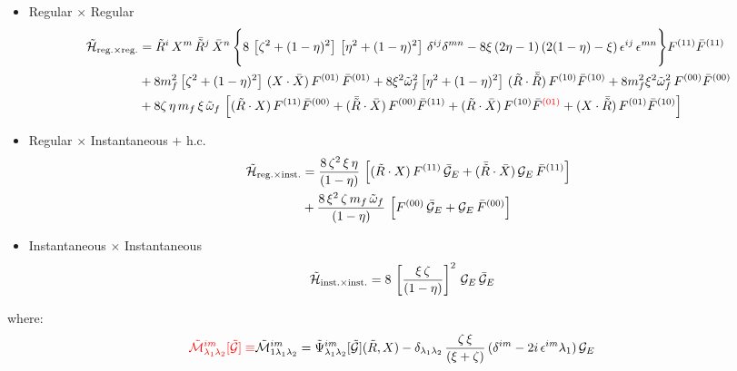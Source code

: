 \documentclass[9pt]{article}
\newcommand{\chg}[1]{{\color{red}#1}}
\numberwithin{equation}{section}
\begin{document}
\begin{itemize}
    \item Regular $\times$ Regular
    \begin{align}
        \mathcal{\Tilde{H}}_{\mathrm{reg.}\times \mathrm{reg.}} & = \Tilde{R}^{i}\, X^{m}\, \Bar{\Tilde{R}}^{j}\,\Bar{X}^{n}\,\Bigg\{8\,\left[\zeta^{2} + (1-\eta)^{2}\right]\,\left[\eta^{2} + (1-\eta)^{2}\right]\,\delta^{ij}\delta^{mn}- 8\xi\, (2\eta -1)\,(2(1-\eta)-\xi)\,\epsilon^{ij}\,\epsilon^{mn}\Bigg\}F^{(11)}\Bar{F}^{(11)}\notag \\ & +8m^{2}_{f}\left[\zeta^{2} + (1-\eta)^{2}\right]\, (X\cdot \Bar{X})\,F^{(01)}\,\Bar{F}^{(01)} + 8\xi^{2}\Tilde{\omega}^{2}_{f}\left[\eta^{2}+(1-\eta)^{2}\right]\,(\Tilde{R}\cdot \Bar{\Tilde{R}})\,F^{(10)}\Bar{F}^{(10)} +8m^{2}_{f}\xi^{2}\Tilde{\omega}^{2}_{f}\,F^{(00)}\Bar{F}^{(00)}\notag \\ & +8\zeta\,\eta\, m_{f}\, \xi\, \Tilde{\omega}_{f}\, \left[(\Tilde{R}\cdot X)\, F^{(11)}\Bar{F}^{(00)} + (\Bar{\Tilde{R}}\cdot \Bar{X})\,F^{(00)}\Bar{F}^{(11)} + (\Tilde{R}\cdot \Bar{X})\,F^{(10)}\Bar{F}^{\chg{(01)}} + (X\cdot \Bar{\Tilde{R}})\,F^{(01)}\Bar{F}^{(10)}\right]
    \label{chg:F01}\end{align}
    \item Regular $\times$ Instantaneous $+$ h.c.
    \begin{align}
               \mathcal{\Tilde{H}}_{\mathrm{reg.}\times \mathrm{inst.}} & = \frac{8\,\zeta^{2}\,\xi\,\eta}{(1-\eta)}\,\left[(\Tilde{R}\cdot X)\,F^{(11)}\,\Bar{\mathcal{G}}_{E} + (\Bar{\Tilde{R}}\cdot \Bar{X})\,\mathcal{G}_{E}\,\Bar{F}^{(11)}\right]\notag \\ & + \frac{8\,\xi^{2}\,\zeta\,m_{f}\,\Tilde{\omega}_{f}}{(1-\eta)}\, \left[F^{(00)}\,\Bar{\mathcal{G}}_{E} + \mathcal{G}_{E}\,\Bar{F}^{(00)}\right]
    \end{align}
\item Instantaneous $\times$ Instantaneous
    \begin{align}
\mathcal{\Tilde{H}}_{\mathrm{inst.}\times \mathrm{inst.}} & = 8\, \left[\frac{\xi\,\zeta}{(1-\eta)}\right]^{2}\, \mathcal{G}_{E}\,\Bar{\mathcal{G}}_{E}
    \end{align}
\end{itemize}
where:
\begin{align}
\chg{\mathcal{\Tilde{M}}^{im}_{\lambda_{1}\lambda_{2}}[\mathcal{\Tilde{G}}] \equiv} \mathcal{\Tilde{M}}^{im}_{1\lambda_{1}\lambda_{2}} &  = \Tilde{\Psi}^{im}_{\lambda_{1}\lambda_{2}}[\mathcal{\Tilde{G}}](\Tilde{R},X) - \delta_{\lambda_{1}\lambda_{2}}\,\frac{\zeta\,\xi}{(\xi + \zeta)}\,(\delta^{im}-2i\,\epsilon^{im}\lambda_{1})\,\mathcal{G}_{E} 
\label{chg:M1q}\end{align}
\end{document}
